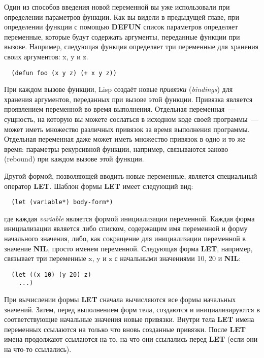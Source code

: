 Один из способов введения новой переменной вы уже использовали при определении параметров
функции. Как вы видели в предыдущей главе, при определении функции с помощью
\textbf{DEFUN} список параметров определяет переменные, которые будут содержать аргументы,
переданные функции при вызове. Например, следующая функция определяет три переменные для
хранения своих аргументов: x, y и z.

\begin{lstlisting}
  (defun foo (x y z) (+ x y z))
\end{lstlisting}

При каждом вызове функции, Lisp создаёт новые \textit{привязки} (\textit{bindings}) для
хранения аргументов, переданных при вызове этой функции. Привязка является проявлением
переменной во время выполнения. Отдельная переменная~--- сущность, на которую вы можете
сослаться в исходном коде своей программы~--- может иметь множество различных привязок за
время выполнения программы. Отдельная переменная даже может иметь множество привязок в
одно и то же время: параметры рекурсивной функции, например, связываются заново (rebound)
при каждом вызове этой функции.

Другой формой, позволяющей вводить новые переменные, является специальный оператор
\textbf{LET}. Шаблон формы \textbf{LET} имеет следующий вид:

\begin{lstlisting}
  (let (variable*) body-form*)
\end{lstlisting}

\noindent{}где каждая \textit{variable} является формой инициализации переменной. Каждая форма
инициализации является либо списком, содержащим имя переменной и форму начального
значения, либо, как сокращение для инициализации переменной в значение \textbf{NIL},
просто именем переменной. Следующая форма \textbf{LET}, например, связывает три переменные
x, y и z с начальными значениями 10, 20 и \textbf{NIL}:

\begin{lstlisting}
  (let ((x 10) (y 20) z)
    ...)
\end{lstlisting}

При вычислении формы \textbf{LET} сначала вычисляются все формы начальных значений. Затем,
перед выполнением форм тела, создаются и инициализируются в соответствующие начальные
значения новые привязки. Внутри тела \textbf{LET} имена переменных ссылаются на только что
вновь созданные привязки. После \textbf{LET} имена продолжают ссылаются на то, на что они
ссылались перед \textbf{LET} (если они на что-то ссылались).

